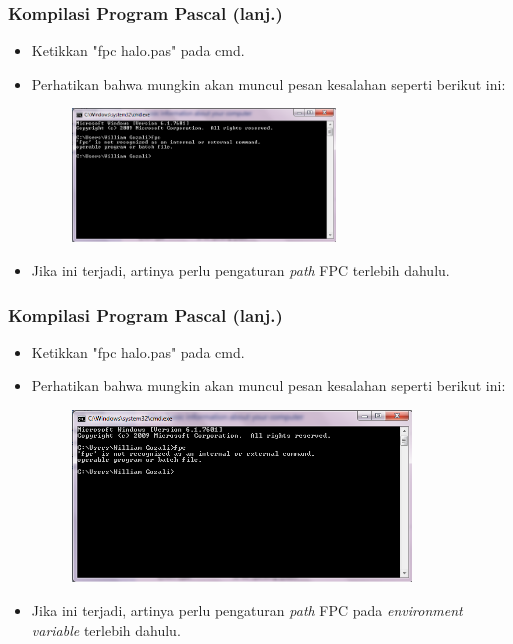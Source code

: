 \documentclass{beamer}
\begin{document}
\begin{frame}
\frametitle{Kompilasi Program Pascal (lanj.)}
\begin{itemize}
	\item Ketikkan "fpc halo.pas" pada cmd.
	\item Perhatikan bahwa mungkin akan muncul pesan kesalahan seperti berikut ini:
	\begin{figure}
		\includegraphics[width=7cm]{asset/cmd_0.PNG}
	\end{figure}
	\item Jika ini terjadi, artinya perlu pengaturan \textit{path} FPC terlebih dahulu.
\end{itemize}
\end{frame}

\begin{frame}
\frametitle{Kompilasi Program Pascal (lanj.)}
\begin{itemize}
	\item Ketikkan "fpc halo.pas" pada cmd.
	\item Perhatikan bahwa mungkin akan muncul pesan kesalahan seperti berikut ini:
	\begin{figure}
		\includegraphics[width=9cm]{asset/cmd_0.PNG}
	\end{figure}
	\item Jika ini terjadi, artinya perlu pengaturan \textit{path} FPC pada \textit{environment variable} terlebih dahulu.
\end{itemize}
\end{frame}
\end{document}
